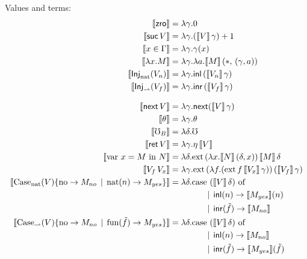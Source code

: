 \noindent Values and terms:
\begin{align*}
  \sem{\zro}         &= \lambda \gamma . 0 \\
  \sem{\suc\, V}     &= \lambda \gamma . (\sem{V}\, \gamma) + 1 \\
  \sem{x \in \Gamma} &= \lambda \gamma . \gamma(x) \\
  \sem{\lda{x}{M}}   &= \lambda \gamma . \lambda a . \sem{M}\, (*,\, (\gamma , a))  \\
  \sem{\injnat{V_n}} &= \lambda \gamma . \inl\, (\sem{V_n}\, \gamma) \\
  \sem{\injarr{V_f}} &= \lambda \gamma . \inr\, (\sem{V_f}\, \gamma) \\[2ex]
  \sem{\nxt\, V}     &= \lambda \gamma . \nxt (\sem{V}\, \gamma) \\
  \sem{\theta}       &= \lambda \gamma . \theta \\
%
  \sem{\err_B}         &= \lambda \delta . \mho \\
  \sem{\ret\, V}       &= \lambda \gamma . \eta\, \sem{V} \\
  \sem{\bind{x}{M}{N}} &= \lambda \delta . \ext {(\lambda x . \sem{N}\, (\delta, x))} {\sem{M}\, \delta} \\
  \sem{V_f\, V_x}      &= \lambda \gamma . \ext {(\lambda f . (\ext {f} {\sem{V_x}\, \gamma}))} {(\sem{V_f}\, \gamma)} \\
  \sem{\casenat{V}{M_{no}}{n}{M_{yes}}}         &= 
    \lambda \delta . \text{case $(\sem{V}\, \delta)$ of} \\ 
    &\quad\quad\quad\quad \alt \inl(n) \to \sem{M_{yes}}(n) \\
    &\quad\quad\quad\quad \alt \inr(\tilde{f}) \to \sem{M_{no}} \\
  \sem{\casearr{V}{M_{no}}{\tilde{f}}{M_{yes}}} &= 
    \lambda \delta . \text{case $(\sem{V}\, \delta)$ of} \\ 
    &\quad\quad\quad\quad \alt \inl(n) \to \sem{M_{no}} \\
    &\quad\quad\quad\quad \alt \inr(\tilde{f}) \to \sem{M_{yes}}(\tilde{f})
\end{align*}
